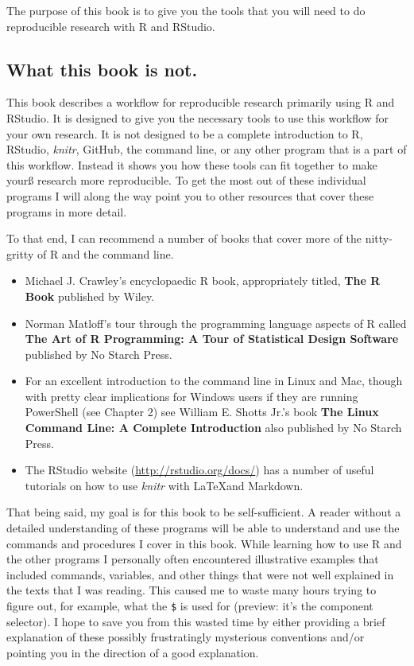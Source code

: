 The purpose of this book is to give you the tools that you will need to do reproducible research with R and RStudio. 

\subsection{What this book is not.}\label{WhatNot}

This book describes a workflow for reproducible research primarily using R and RStudio. It is designed to give you the necessary tools to use this workflow for your own research. It is not designed to be a complete introduction to R, RStudio, {\emph{knitr}}, GitHub, the command line, or any other program that is a part of this workflow. Instead it shows you how these tools can fit together to make yourß research more reproducible. To get the most out of these individual programs I will along the way point you to other resources that cover these programs in more detail.

To that end, I can recommend a number of books that cover more of the nitty-gritty of R and the command line.

\begin{itemize}
    \item Michael J. Crawley's encyclopaedic R book, appropriately titled, \textbf{The R Book} published by Wiley.
    
    \item Norman Matloff's tour through the programming language aspects of  R called \textbf{The Art of R Programming: A Tour of Statistical Design Software} published by No Starch Press.
    
    \item For an excellent introduction to the command line in Linux and Mac, though with pretty clear implications for Windows users if they are running PowerShell (see Chapter 2) see William E. Shotts Jr.'s book \textbf{The Linux Command Line: A Complete Introduction} also published by No Starch Press.
    
    \item The RStudio website (\url{http://rstudio.org/docs/}) has a
  number of useful tutorials on how to use {\emph{knitr}} with \LaTeX and Markdown.
\end{itemize}

That being said, my goal is for this book to be self-sufficient. A reader without a detailed understanding of these programs will be able to understand and use the commands and procedures I cover in this book. While learning how to use R and the other programs I personally often encountered illustrative examples that included commands, variables, and other things that were not well explained in the texts that I was reading. This caused me to waste many hours trying to figure out, for example, what the \texttt{\$} is used for (preview: it's the component selector). I hope to save you from this wasted time by either providing a brief explanation of these possibly frustratingly mysterious conventions and/or pointing you in the direction of a good explanation.

